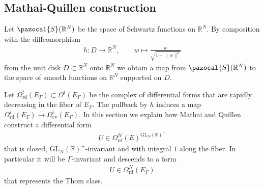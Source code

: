 \documentclass[a4paper,11pt]{amsart} %
\newcommand{\8}{\infty}
\newcommand{\NN}{\mathbb{N}}
\newcommand{\GL}{\mathrm{GL}}
\newcommand{\R}{\mathbb{R}}
\newcommand{\Scal}{\pazocal{S}}
\newcommand{\rd}{\textrm{rd}}
\newcommand{\cv}{\textrm{cv}}
\theoremstyle{mytheoremstyle}
\theoremstyle{remark}
\numberwithin{equation}{section}
\begin{document}



\subsection{Mathai-Quillen construction} \label{mqconstruction}

Let $\Scal(\R^{N})$ be the space of Schwartz functions on $\R^N$. By composition with the diffeomorphism 
\begin{align}
    h \colon D \longrightarrow \R^{N}, \qquad
    w  \longmapsto \frac{w}{\sqrt{1-\lVert w \rVert^2}}
\end{align}
from the unit disk $D \subset \R^{N}$ onto $\R^{N}$ we obtain a map from $\Scal(\R^{N})$ to the space of smooth functions on $\R^{N}$ supported on $D$.

Let $\Omega^i_{\rd}(E_\Gamma) \subset \Omega^i(E_\Gamma)$ be the complex of differential forms that are rapidly decreasing in the fiber of $E_\Gamma$. The pullback by $h$ induces a map $\Omega^i_{\rd}(E_\Gamma) \longrightarrow \Omega^i_{\cv}(E_\Gamma)$. %
In this section we explain how Mathai and Quillen construct a differential form 
\begin{align}
    U \in \Omega_{\rd}^{N}(E)^{\GL_N(\R)^+}
\end{align}
that is closed, $\GL_N(\R)^+$-invariant and with integral $1$ along the fiber. In particular it will be $\Gamma$-invariant and descends to a form
\begin{align}
    U \in \Omega_{\rd}^{N}(E_\Gamma)
\end{align}
that represents the Thom class.
\end{document}
